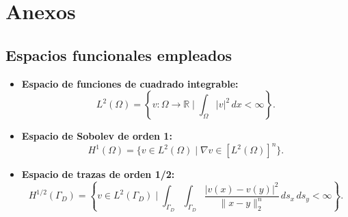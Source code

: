 \documentclass[11pt]{book}
\newcommand{\clearemptydoublepage}{\newpage{\pagestyle{empty}\cleardoublepage}}
\newcommand{\sectionmarkwithoutsections}[1]{\markright{#1}}
\theoremstyle{plain} %
\theoremstyle{definition} %
\theoremstyle{definition} %
\begin{document}
\chaptermark{\bibname}
\sectionmarkwithoutsections{\bibname}

\nocite{*}

\clearemptydoublepage



\pagestyle{estiloanexos}

\setcounter{section}{0}        
\renewcommand{\thechapter}{A}  
\renewcommand{\thesection}{A.\arabic{section}} 

\chapter*{Anexos}

\section{Espacios funcionales empleados}

\begin{itemize}
    \item \textbf{Espacio de funciones de cuadrado integrable:}
    \begin{equation*}
        L^2(\Omega) = \left\{ v : \Omega \to \mathbb{R} \mid \int_{\Omega} |v|^2 \, dx < \infty \right\}.
    \end{equation*}
    
    \item \textbf{Espacio de Sobolev de orden 1:}
    \begin{equation*}
        H^1(\Omega) = \{ v \in L^2(\Omega) \mid \nabla v \in [L^2(\Omega)]^n \}.
    \end{equation*}
    
    \item \textbf{Espacio de trazas de orden 1/2:}
    \begin{equation*}
        H^{1/2}(\Gamma_D) = \left\{ v \in L^2(\Gamma_D) \mid \int_{\Gamma_D} \int_{\Gamma_D} \frac{|v(x) - v(y)|^2}{\|x - y\|^n_2} \, ds_x \, ds_y < \infty \right\}.
    \end{equation*}
\end{itemize}
\end{document}
